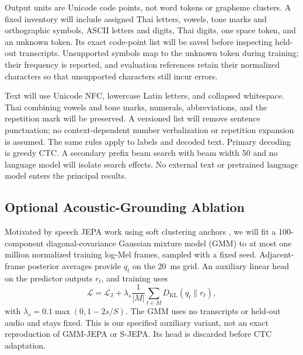 Output units are Unicode code points, not word tokens or grapheme clusters. A fixed inventory will include assigned Thai letters, vowels, tone marks and orthographic symbols, ASCII letters and digits, Thai digits, one space token, and an unknown token. Its exact code-point list will be saved before inspecting held-out transcripts. Unsupported symbols map to the unknown token during training; their frequency is reported, and evaluation references retain their normalized characters so that unsupported characters still incur errors.

Text will use Unicode NFC, lowercase Latin letters, and collapsed whitespace. Thai combining vowels and tone marks, numerals, abbreviations, and the repetition mark will be preserved. A versioned list will remove sentence punctuation; no context-dependent number verbalization or repetition expansion is assumed. The same rules apply to labels and decoded text. Primary decoding is greedy CTC. A secondary prefix beam search with beam width 50 and no language model will isolate search effects. No external text or pretrained language model enters the principal results.

\subsection{Optional Acoustic-Grounding Ablation}
Motivated by speech JEPA work using soft clustering anchors \cite{ioannides2026gmmjepa}, we will fit a 100-component diagonal-covariance Gaussian mixture model (GMM) to at most one million normalized training log-Mel frames, sampled with a fixed seed. Adjacent-frame posterior averages provide $q_t$ on the 20~ms grid. An auxiliary linear head on the predictor outputs $r_t$, and training uses
\begin{equation}
\mathcal{L}=\mathcal{L}_{\mathrm{J}}+
\lambda_s\frac{1}{|M|}\sum_{t\in M}
D_{\mathrm{KL}}(q_t\|r_t),
\end{equation}
with $\lambda_s=0.1\max(0,1-2s/S)$. The GMM uses no transcripts or held-out audio and stays fixed. This is our specified auxiliary variant, not an exact reproduction of GMM-JEPA or S-JEPA. Its head is discarded before CTC adaptation.
